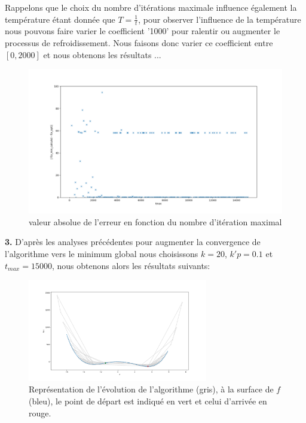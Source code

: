 \documentclass[12pt]{article}
\begin{document}
\begin{minipage}{0.5\textwidth}
Rappelons que le choix du nombre d'itérations maximale influence également la température étant donnée que $T=\frac{1}{t}$, pour observer l'influence de la température nous pouvons faire varier le coefficient  '1000' pour ralentir ou augmenter le processus de refroidissement. Nous faisons donc varier ce coefficient entre $[0,2000]$ et nous obtenons les résultats ...
\end{minipage} \hfill
\begin{minipage}{0.45\textwidth}
\begin{figure}[H]
\includegraphics[width=1\textwidth]{Q1_T.png}
\caption{valeur absolue de l'erreur en fonction du nombre d'itération maximal}
\label{Q1_T}
\end{figure}
\end{minipage}

\textbf{\color{brick}3.} D'après les analyses précédentes pour augmenter la convergence de l'algorithme vers le minimum global nous choisissons $k=20$, $k'p=0.1$ et $t_{max}=15000$, nous obtenons alors les résultats suivants:
\begin{figure}[H]
\centering
\includegraphics[width=0.7\textwidth]{Q132.png}
\caption{Représentation de l'évolution de l'algorithme (gris), à la surface de $f$ (bleu), le point de départ est indiqué en vert et celui d'arrivée en rouge.}
\label{Q1_T}
\end{figure}
\end{document}
